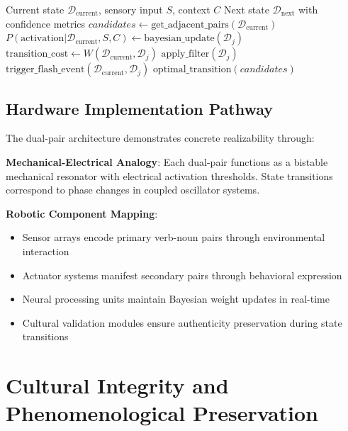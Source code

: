 \documentclass[11pt]{article}
\begin{document}
\begin{algorithm}
\caption{Dual-Pair Filter-Flash Activation}
\begin{algorithmic}[1]
\Require Current state $\mathcal{D}_{\text{current}}$, sensory input $S$, context $C$
\Ensure Next state $\mathcal{D}_{\text{next}}$ with confidence metrics
\State $candidates \leftarrow \text{get\_adjacent\_pairs}(\mathcal{D}_{\text{current}})$
    \State $P(\text{activation}|\mathcal{D}_{\text{current}}, S, C) \leftarrow \text{bayesian\_update}(\mathcal{D}_j)$
    \State $\text{transition\_cost} \leftarrow W(\mathcal{D}_{\text{current}}, \mathcal{D}_j)$
        \State $\text{apply\_filter}(\mathcal{D}_j)$
    \EndIf
        \State $\text{trigger\_flash\_event}(\mathcal{D}_{\text{current}}, \mathcal{D}_j)$
    \EndIf
\EndFor
\Return $\text{optimal\_transition}(candidates)$
\end{algorithmic}
\end{algorithm}

\subsection{Hardware Implementation Pathway}

The dual-pair architecture demonstrates concrete realizability through:

\textbf{Mechanical-Electrical Analogy}: Each dual-pair functions as a bistable mechanical resonator with electrical activation thresholds. State transitions correspond to phase changes in coupled oscillator systems.

\textbf{Robotic Component Mapping}: 
\begin{itemize}
\item Sensor arrays encode primary verb-noun pairs through environmental interaction
\item Actuator systems manifest secondary pairs through behavioral expression
\item Neural processing units maintain Bayesian weight updates in real-time
\item Cultural validation modules ensure authenticity preservation during state transitions
\end{itemize}

\section{Cultural Integrity and Phenomenological Preservation}
\end{document}
